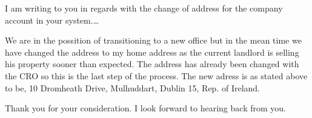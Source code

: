 \documentclass[10pt,stdletter]{newlfm}
\begin{document}
\begin{newlfm}

I am writing to you in regards with the change of address for the company account in your system.\ldots{}

We are in the possition of transitioning to a new office but in the mean time we have changed the address to my home address as the current landlord is selling his property sooner than expected. The address has already been changed with the CRO so this is the last step of the process. The new adress is as stated above to be, 10 Dromheath Drive, Mulhuddart, Dublin 15, Rep. of Ireland.

Thank you for your consideration.  I look forward to
hearing back from you.


\end{newlfm}
\end{document}
